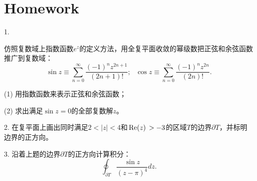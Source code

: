 \documentclass[CJK]{beamer}
\begin{document}
\section{Homework}

\begin{frame}
\bch
    {\small
      
\bitem
\item[1.]{仿照复数域上指数函数$e^z$的定义方法，用全复平面收敛的幂级数把正弦和余弦函数推广到复数域：
  $$\sin z \equiv \sum_{n=0}^\infty \frac{(-1)^nz^{2n+1}}{(2n+1)!};\ \ \ \cos z \equiv \sum_{n=0}^\infty \frac{(-1)^nz^{2n}}{(2n)!}.$$
  \bitem
  \item[(1)]{ 用指数函数来表示正弦和余弦函数；}
  \item[(2)]{ 求出满足$\sin z = 0$的全部复数解$z$。}
    \eitem
    }
\item[2.]{在复平面上画出同时满足$2<|z|<4$和$\,\mathrm{Re}{\left(z\right)\,}>-3$的区域$T$的边界$\partial T$，并标明边界的正方向。} 
\item[3.]{沿着上题的边界$\partial T$的正方向计算积分：
  $$\oint_{\partial T} \frac{\sin z}{(z-\pi)^4}dz .$$
}
\eitem
 }
\ech
\end{frame}
\end{document}
